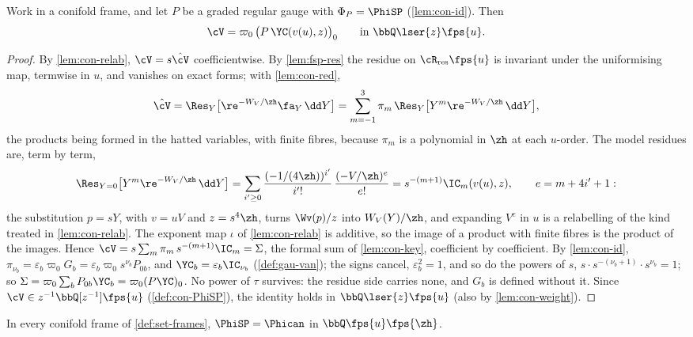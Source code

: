 \begin{prop}
\label{prop:con-res}
Work in a conifold frame, and let $P$ be a graded regular gauge with $\Phi_P=\PhiSP$ (\cref{lem:con-id}). Then
\[
\cV=\varpi_0\,\bigl(P\,\YC(v(u),z)\bigr)_0\qquad\text{in }\bbQ\lser{z}\fps{u}.
\]
\end{prop}

\begin{proof}
By \cref{lem:con-relab}, $\cV=s\hat\cV$ coefficientwise. By \cref{lem:fsp-res} the residue on $\cR_{\mathrm{res}}\fps{u}$ is invariant under the uniformising map, termwise in $u$, and vanishes on exact forms; with \cref{lem:con-red},
\[
\hat\cV=\Res_Y\bigl[\re^{-W_V/\zh}\fa_Y\,\dd Y\bigr]=\sum_{m=-1}^3\pi_m\,\Res_Y\bigl[Y^m\re^{-W_V/\zh}\,\dd Y\bigr],
\]
the products being formed in the hatted variables, with finite fibres, because $\pi_m$ is a polynomial in $\zh$ at each $u$-order. The model residues are, term by term,
\[
\Res_{Y=0}\bigl[Y^m\re^{-W_V/\zh}\,\dd Y\bigr]=\sum_{i'\geq0}\frac{(-1/(4\zh))^{i'}}{i'!}\,\frac{(-V/\zh)^e}{e!}=s^{-(m+1)}\IC_m(v(u),z),\qquad e=m+4i'+1:
\]
the substitution $p=sY$, with $v=uV$ and $z=s^4\zh$, turns $\Wv(p)/z$ into $W_V(Y)/\zh$, and expanding $V^e$ in $u$ is a relabelling of the kind treated in \cref{lem:con-relab}. The exponent map $\iota$ of \cref{lem:con-relab} is additive, so the image of a product with finite fibres is the product of the images. Hence $\cV=s\sum_m\pi_m\,s^{-(m+1)}\IC_m=\Sigma$, the formal sum of \cref{lem:con-key}, coefficient by coefficient. By \cref{lem:con-id}, $\pi_{\nu_b}=\varepsilon_b\varpi_0G_b=\varepsilon_b\varpi_0s^{\nu_b}P_{0b}$, and $\YC_b=\varepsilon_b\IC_{\nu_b}$ (\cref{def:gau-van}); the signs cancel, $\varepsilon_b^2=1$, and so do the powers of $s$, $s\cdot s^{-(\nu_b+1)}\cdot s^{\nu_b}=1$; so $\Sigma=\varpi_0\sum_bP_{0b}\YC_b=\varpi_0(P\YC)_0$. No power of $\tau$ survives: the residue side carries none, and $G_b$ is defined without it. Since $\cV\in z^{-1}\bbQ[z^{-1}]\fps{u}$ (\cref{def:con-PhiSP}), the identity holds in $\bbQ\lser{z}\fps{u}$ (also by \cref{lem:con-weight}).
\end{proof}

\begin{thm}[Theorem P(b)]
\label{thm:con-Pb}
In every conifold frame of \cref{def:set-frames}, $\PhiSP=\Phican$ in $\bbQ\fps{u}\fps{\zh}$.
\end{thm}

